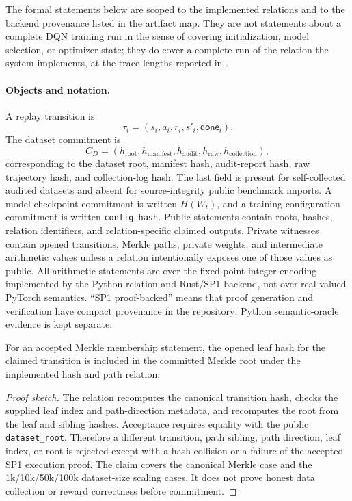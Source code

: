 The formal statements below are scoped to the implemented relations and to the
backend provenance listed in the artifact map. They are not statements about a
complete DQN training run in the sense of covering initialization, model
selection, or optimizer state; they do cover a complete run of the relation the
system implements, at the trace lengths reported in
.

\paragraph{Objects and notation.}
A replay transition is
\[
  \tau_i=(s_i,a_i,r_i,s'_i,\mathsf{done}_i).
\]
The dataset commitment is
\[
  C_D=(h_{\mathrm{root}}, h_{\mathrm{manifest}}, h_{\mathrm{audit}},
       h_{\mathrm{raw}}, h_{\mathrm{collection}}),
\]
corresponding to the dataset root, manifest hash, audit-report hash, raw
trajectory hash, and collection-log hash. The last field is present for
self-collected audited datasets and absent
for source-integrity public benchmark imports.  A model checkpoint commitment
is written $H(W_t)$, and a training configuration commitment is written
\texttt{config\_hash}.  Public statements contain roots, hashes, relation
identifiers, and relation-specific claimed outputs.  Private witnesses contain
opened transitions, Merkle paths, private weights, and intermediate arithmetic
values unless a relation intentionally exposes one of those values as public.
All arithmetic statements are over the fixed-point integer encoding implemented
by the Python relation and Rust/SP1 backend, not over real-valued PyTorch
semantics.  ``SP1 proof-backed'' means that proof generation and verification
have compact provenance in the repository; Python semantic-oracle evidence is
kept separate.

\begin{theorem}
\label{thm:replay-membership}
For an accepted Merkle membership statement, the opened leaf hash for the
claimed transition is included in the committed Merkle root under the
implemented hash and path relation.
\end{theorem}
\begin{proof}[Proof sketch]
The relation recomputes the canonical transition hash, checks the supplied
leaf index and path-direction metadata, and recomputes the root from the leaf
and sibling hashes.  Acceptance requires equality with the public
\texttt{dataset\_root}.  Therefore a different transition, path sibling, path
direction, leaf index, or root is rejected except with a hash collision or a
failure of the accepted SP1 execution proof.  The claim covers the canonical
Merkle case and the 1k/10k/50k/100k dataset-size scaling cases.  It does not prove
honest data collection or reward correctness before commitment.
\end{proof}

